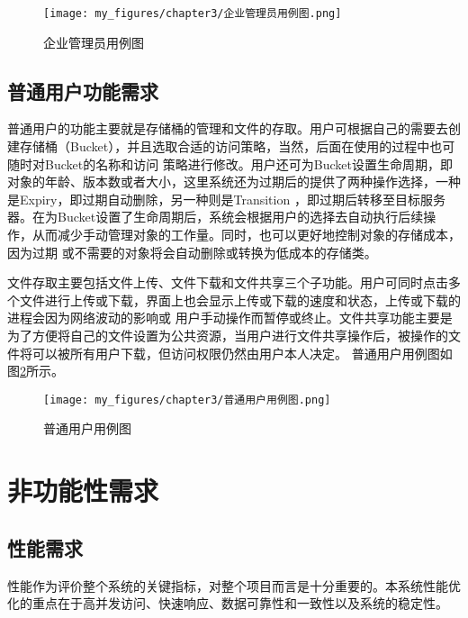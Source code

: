 \begin{figure}[h]
    \centering
    \texttt{[image: my\_figures/chapter3/企业管理员用例图.png]}
    \caption{企业管理员用例图} 
    \label{fig:企业管理员用例图}
\end{figure}

\subsection{普通用户功能需求}

普通用户的功能主要就是存储桶的管理和文件的存取。用户可根据自己的需要去创建存储桶（Bucket），并且选取合适的访问策略，当然，后面在使用的过程中也可随时对Bucket的名称和访问
策略进行修改。用户还可为Bucket设置生命周期，即对象的年龄、版本数或者大小，这里系统还为过期后的提供了两种操作选择，一种是Expiry，即过期自动删除，另一种则是Transition
，即过期后转移至目标服务器。在为Bucket设置了生命周期后，系统会根据用户的选择去自动执行后续操作，从而减少手动管理对象的工作量。同时，也可以更好地控制对象的存储成本，因为过期
或不需要的对象将会自动删除或转换为低成本的存储类。

文件存取主要包括文件上传、文件下载和文件共享三个子功能。用户可同时点击多个文件进行上传或下载，界面上也会显示上传或下载的速度和状态，上传或下载的进程会因为网络波动的影响或
用户手动操作而暂停或终止。文件共享功能主要是为了方便将自己的文件设置为公共资源，当用户进行文件共享操作后，被操作的文件将可以被所有用户下载，但访问权限仍然由用户本人决定。
普通用户用例图如图\ref{fig:普通用户用例图}所示。

\begin{figure}[h]
    \centering
    \texttt{[image: my\_figures/chapter3/普通用户用例图.png]}
    \caption{普通用户用例图} 
    \label{fig:普通用户用例图}

\end{figure}

\section{非功能性需求}

\subsection{性能需求}

性能作为评价整个系统的关键指标，对整个项目而言是十分重要的。本系统性能优化的重点在于高并发访问、快速响应、数据可靠性和一致性以及系统的稳定性。

